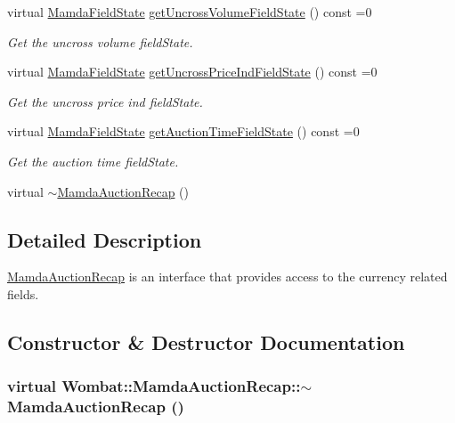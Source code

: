 \begin{CompactItemize}
virtual \hyperlink{namespaceWombat_93aac974f2ab713554fd12a1fa3b7d2a}{Mamda\-Field\-State} \hyperlink{classWombat_1_1MamdaAuctionRecap_b266597424a229c509ca514324c11808}{get\-Uncross\-Volume\-Field\-State} () const =0
\begin{CompactList}\small\item\em Get the uncross volume field\-State. \item\end{CompactList}\item 
virtual \hyperlink{namespaceWombat_93aac974f2ab713554fd12a1fa3b7d2a}{Mamda\-Field\-State} \hyperlink{classWombat_1_1MamdaAuctionRecap_b9fe8043eff51c5319bd348861da58cc}{get\-Uncross\-Price\-Ind\-Field\-State} () const =0
\begin{CompactList}\small\item\em Get the uncross price ind field\-State. \item\end{CompactList}\item 
virtual \hyperlink{namespaceWombat_93aac974f2ab713554fd12a1fa3b7d2a}{Mamda\-Field\-State} \hyperlink{classWombat_1_1MamdaAuctionRecap_9acb736c81b7688a11c12295f6c16597}{get\-Auction\-Time\-Field\-State} () const =0
\begin{CompactList}\small\item\em Get the auction time field\-State. \item\end{CompactList}\item 
virtual \hyperlink{classWombat_1_1MamdaAuctionRecap_30326a641790eb0e947dcbd9343f6473}{$\sim$Mamda\-Auction\-Recap} ()
\end{CompactItemize}


\subsection{Detailed Description}
\hyperlink{classWombat_1_1MamdaAuctionRecap}{Mamda\-Auction\-Recap} is an interface that provides access to the currency related fields. 



\subsection{Constructor \& Destructor Documentation}
\hypertarget{classWombat_1_1MamdaAuctionRecap_30326a641790eb0e947dcbd9343f6473}{
\subsubsection[$\sim$MamdaAuctionRecap]{\setlength{\rightskip}{0pt plus 5cm}virtual Wombat::Mamda\-Auction\-Recap::$\sim$Mamda\-Auction\-Recap ()}}
\label{classWombat_1_1MamdaAuctionRecap_30326a641790eb0e947dcbd9343f6473}




